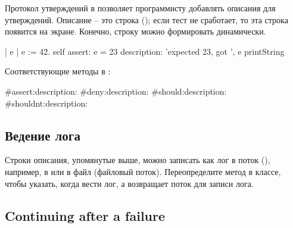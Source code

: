 \documentclass[a4paper,10pt,twoside]{book}
\begin{document}
Протокол утверждений в  позволяет программисту добавлять описания для утверждений.
Описание – это строка (); если тест не сработает, то эта строка появится на экране.
Конечно, строку можно формировать динамически.

\begin{code}{}
| e |
e := 42.
self assert: e = 23
	description: 'expected 23, got ', e printString
\end{code}

Соответствующие методы в :

\begin{code}{}
#assert:description:
#deny:description:
#should:description:
#shouldnt:description:
\end{code}

\subsection{Ведение лога}

Строки описания, упомянутые выше, можно записать как лог в поток (), например, в 
или в файл (файловый поток). Переопределите метод  в классе,
чтобы указать, когда вести лог, а  возвращает поток для записи лога.

\subsection{Continuing after a failure}
\end{document}

